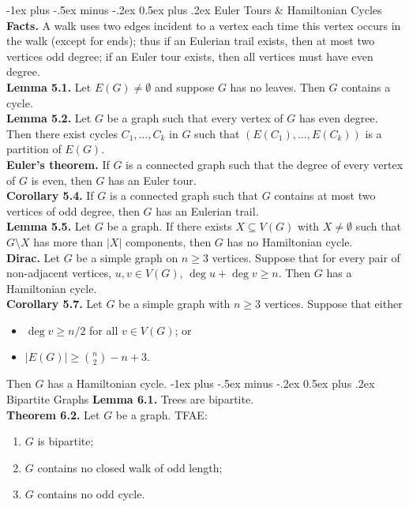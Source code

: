 \documentclass[10pt,landscape]{article}
\makeatletter
\renewcommand{\section}{\@startsection{section}{1}{0mm}%
                                {-1ex plus -.5ex minus -.2ex}%
                                {0.5ex plus .2ex}%
                                {\normalfont\large\bfseries}}
\makeatother
\begin{document}
\begin{multicols}{3}
\section{Euler Tours \& Hamiltonian Cycles}
\textbf{Facts.} A walk uses two edges incident to a vertex each time this vertex occurs in the walk (except for ends); thus if an Eulerian trail exists, then at most two vertices odd degree; if an Euler tour exists, then all vertices must have even degree. \\ 
\textbf{Lemma 5.1.} Let \( E(G) \neq \emptyset  \) and suppose \( G \) has no leaves. Then \( G \) contains a cycle. \\
\textbf{Lemma 5.2.} Let \( G \) be a graph such that every vertex of \( G \) has even degree. Then there exist cycles \( C_1, \hdots , C_k \) in \( G \) such that \( (E(C_1), \hdots , E(C_k)) \) is a partition of \( E(G). \) \\
\textbf{Euler's theorem.} If \( G \) is a connected graph such that the degree of every vertex of \( G \) is even, then \( G \) has an Euler tour. \\
\textbf{Corollary 5.4.} If \( G \) is a connected graph such that \( G \) contains at most two vertices of odd degree, then \( G \) has an Eulerian trail. \\
\textbf{Lemma 5.5.} Let \( G \) be a graph. If there exists \( X \subseteq V(G) \) with \( X \neq \emptyset  \) such that \( G \setminus X \) has more than \( |X| \) components, then \( G \) has no Hamiltonian cycle. \\
\textbf{Dirac.} Let \( G \) be a simple graph on \( n \geq 3\) vertices. Suppose that for every pair of non-adjacent vertices, \( u ,v \in V(G) \), \( \deg u + \deg v \geq n \). Then \( G \) has a Hamiltonian cycle. \\
\textbf{Corollary 5.7.} Let \( G \) be a simple graph with \( n \geq 3 \) vertices. Suppose that either
\begin{itemize}
	\item \( \deg v \geq n / 2 \) for all \( v \in V(G) \); or
	\item \(|E(G)| \geq \binom{n}{2} -n +3.\)
	
	
\end{itemize}
Then \( G \) has a Hamiltonian cycle.
\section{Bipartite Graphs}
\textbf{Lemma 6.1.} Trees are bipartite. \\
\textbf{Theorem 6.2.} Let \( G \) be a graph. TFAE:
\begin{enumerate}
	\item \( G \) is bipartite;
	\item \( G \) contains no closed walk of odd length;
	\item \( G \) contains no odd cycle.
\end{enumerate}


\end{multicols}
\end{document}
